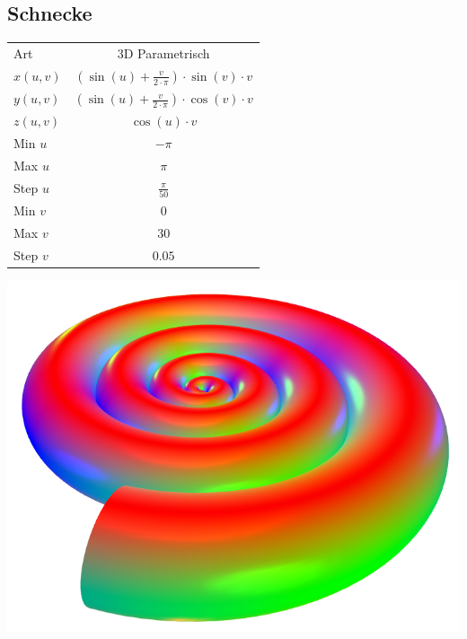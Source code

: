 \documentclass{scrartcl}
\begin{document}
\subsection{Schnecke}
\begin{tabular}[b]{|l|c|}
\hline
\rowcolor[gray]{0.5}
Art &  3D Parametrisch \\
\rowcolor[gray]{1}
\(x(u,v)\) & \((\sin(u)+\frac{v}{2 \cdot \pi}) \cdot \sin(v) \cdot v\) \\
\rowcolor[gray]{0.5}
\(y(u,v)\) & \((\sin(u)+\frac{v}{2 \cdot \pi}) \cdot \cos(v) \cdot v\) \\
\rowcolor[gray]{1}
\(z(u,v)\) & \(\cos(u) \cdot v\) \\
\rowcolor[gray]{0.5}
Min \(u\) & \(-\pi\) \\
\rowcolor[gray]{1}
Max \(u\) & \(\pi\) \\
\rowcolor[gray]{0.5}
Step \(u\) & \(\frac{\pi}{50}\) \\
\rowcolor[gray]{1}
Min \(v\) & \(0\) \\
\rowcolor[gray]{0.5}
Max \(v\) & \(30\) \\
\rowcolor[gray]{1}
Step \(v\) &\(0.05\) \\
\hline
\end{tabular}
\includegraphics[height=0.22\textheight]{images/graphs/schnecke.png}
\end{document}
